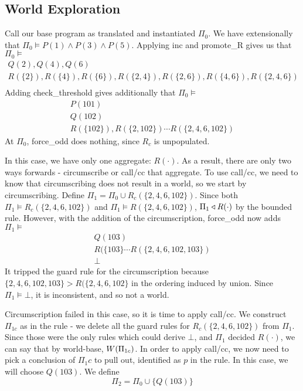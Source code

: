 \subsection{World Exploration}
Call our base program as translated and instantiated $\Pi_0$.
We have extensionally that $\Pi_0 \models P(1) \wedge P(3) \wedge P(5)$.
Applying inc and promote\_R gives us that $\Pi_0 \models$
\begin{align*}
	Q(2), Q(4), Q(6)\\
	R(\{2\}), R(\{4\}), R(\{6\}), R(\{2, 4\}), R(\{2, 6\}), R(\{4, 6\}), R(\{2, 4, 6\})\\
\end{align*}
Adding check\_threshold gives additionally that $\Pi_0 \models$
\begin{align*}
	P(101)\\
	Q(102)\\
	R(\{102\}), R(\{2, 102\}) \cdots R(\{2, 4, 6, 102\})
\end{align*}
At $\Pi_0$, force\_odd does nothing, since $R_c$ is unpopulated.

In this case, we have only one aggregate: $R(\cdot)$.
As a result, there are only two ways forwards - circumscribe or call/cc that aggregate.
To use call/cc, we need to know that circumscribing does not result in a world, so we start by circumscribing.
Define $\Pi_1 = \Pi_0 \cup R_c(\{2, 4, 6, 102\})$.
Since both $\Pi_1 \models R_c(\{2, 4, 6, 102\})$ and $\Pi_1 \models R(\{2, 4, 6, 102\})$, $\Pi_1 \triangleleft R(\cdot)$ by the bounded rule.
However, with the addition of the circumscription, force\_odd now adds $\Pi_1 \models$
\begin{align*}
	Q(103)\\
	R(\{103\} \cdots R(\{2, 4, 6, 102, 103\})\\
	\bot
\end{align*}
It tripped the guard rule for the circumscription because $\{2, 4, 6, 102, 103\} > R(\{2, 4, 6, 102\}$ in the ordering induced by union.
Since $\Pi_1 \models \bot$, it is inconsistent, and so not a world.

Circumscription failed in this case, so it is time to apply call/cc.
We construct $\Pi_{1c}$ as in the rule - we delete all the guard rules for $R_c(\{2, 4, 6, 102\})$ from $\Pi_1$.
Since those were the only rules which could derive $\bot$, and $\Pi_1$ decided $R(\cdot)$, we can say that by world-base, $W({\Pi_{1c}})$.
In order to apply call/cc, we now need to pick a conclusion of $\Pi_1c$ to pull out, identified as $p$ in the rule.
In this case, we will choose $Q(103)$.
We define
\[
	\Pi_2 = \Pi_0 \cup \{Q(103)\}
\]

